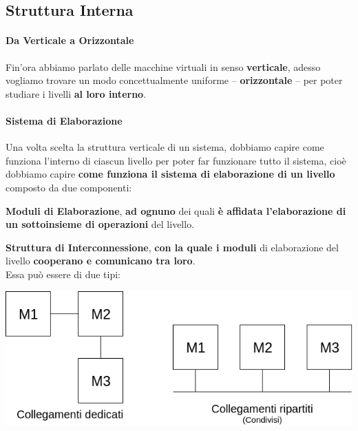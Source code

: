 \documentclass[10pt]{report}
\begin{document}
\subsection{Struttura Interna}
\paragraph{Da Verticale a Orizzontale} Fin'ora abbiamo parlato delle macchine virtuali in senso \textbf{verticale}, adesso vogliamo trovare un modo concettualmente uniforme -- \textbf{orizzontale} -- per poter studiare i livelli \textbf{al loro interno}.
\paragraph{Sistema di Elaborazione} Una volta scelta la struttura verticale di un sistema, dobbiamo capire come funziona l'interno di ciascun livello per poter far funzionare tutto il sistema, cioè dobbiamo capire \textbf{come funziona il sistema di elaborazione di un livello} composto da due componenti:
\begin{list}{}{}
	\item \textbf{Moduli di Elaborazione}, \textbf{ad ognuno} dei quali \textbf{è affidata l'elaborazione di un sottoinsieme di operazioni} del livello.
	\item \textbf{Struttura di Interconnessione}, \textbf{con la quale i moduli} di elaborazione del livello \textbf{cooperano e comunicano tra loro}.\\
	Essa può essere di due tipi:
\end{list}
	\begin{center}\includegraphics[scale=0.6]{strutturainterna.png}
\end{center}
\end{document}
